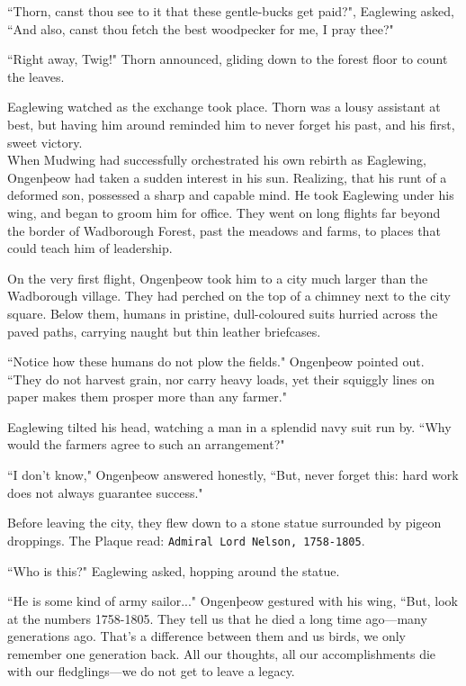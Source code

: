 ``Thorn, canst thou see to it that these gentle-bucks get paid?", Eaglewing asked,  ``And also, canst thou fetch the best woodpecker for me, I pray thee?"

``Right away, Twig!" Thorn announced, gliding down to the forest floor to count the leaves.

Eaglewing watched as the exchange took place. Thorn was a lousy assistant at best, but having him around reminded him to never forget his past, and his first, sweet victory.\\

When Mudwing had successfully orchestrated his own rebirth as Eaglewing, Ongenþeow had taken a sudden interest in his sun. Realizing, that his runt of a deformed son, possessed a sharp and capable mind. He took Eaglewing under his wing, and began to groom him for office. They went on long flights far beyond the border of Wadborough Forest, past the meadows and farms, to places that could teach him of leadership.

On the very first flight, Ongenþeow took him to a city much larger than the Wadborough village. They had perched on the top of a chimney next to the city square. Below them, humans in pristine, dull-coloured suits hurried across the paved paths, carrying naught but thin leather briefcases.

``Notice how these humans do not plow the fields." Ongenþeow pointed out. ``They do not harvest grain, nor carry heavy loads, yet their squiggly lines on paper makes them prosper more than any farmer."

Eaglewing tilted his head, watching a man in a splendid navy suit run by. ``Why would the farmers agree to such an arrangement?"

``I don't know," Ongenþeow answered honestly, ``But, never forget this: hard work does not always guarantee success."

Before leaving the city, they flew down to a stone statue surrounded by pigeon droppings. The Plaque read: \texttt{Admiral Lord Nelson, 1758-1805}.

``Who is this?" Eaglewing asked, hopping around the statue.

``He is some kind of army sailor..." Ongenþeow gestured with his wing, ``But, look at the numbers 1758-1805. They tell us that he died a long time ago---many generations ago.
That's a difference between them and us birds, we only remember one generation back.
All our thoughts, all our accomplishments die with our fledglings---we do not get to leave a legacy.\\

